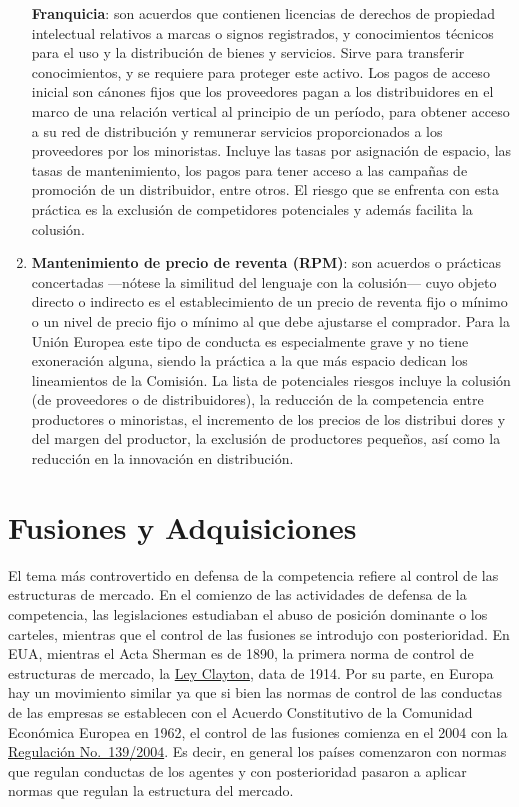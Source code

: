 \documentclass[
  12pt,
  spanish,
]{book}
\begin{document}
\begin{enumerate}
  \textbf{Franquicia}: son acuerdos que contienen licencias de derechos
  de propiedad intelectual relativos a marcas o signos registrados, y
  conocimientos técnicos para el uso y la distribución de bienes y
  servicios. Sirve para transferir conocimientos, y se requiere para
  proteger este activo. Los pagos de acceso inicial son cánones fijos
  que los proveedores pagan a los distribuidores en el marco de una
  relación vertical al principio de un período, para obtener acceso a su
  red de distribución y remunerar servicios proporcionados a los
  proveedores por los minoristas. Incluye las tasas por asignación de
  espacio, las tasas de mantenimiento, los pagos para tener acceso a las
  campañas de promoción de un distribuidor, entre otros. El riesgo que
  se enfrenta con esta práctica es la exclusión de competidores
  potenciales y además facilita la colusión.
\item
  \textbf{Mantenimiento de precio de reventa (RPM)}: son acuerdos o
  prácticas concertadas ---nótese la similitud del lenguaje con la
  colusión--- cuyo objeto directo o indirecto es el establecimiento de
  un precio de reventa fijo o mínimo o un nivel de precio fijo o mínimo
  al que debe ajustarse el comprador. Para la Unión Europea este tipo de
  conducta es especialmente grave y no tiene exoneración alguna, siendo
  la práctica a la que más espacio dedican los lineamientos de la
  Comisión. La lista de potenciales riesgos incluye la colusión (de
  proveedores o de distribuidores), la reducción de la competencia entre
  productores o minoristas, el incremento de los precios de los
  distribui dores y del margen del productor, la exclusión de
  productores pequeños, así como la reducción en la innovación en
  distribución.
\end{enumerate}

\hypertarget{fusiones-y-adquisiciones}{%
\section{Fusiones y Adquisiciones}\label{fusiones-y-adquisiciones}}

El tema más controvertido en defensa de la competencia refiere al
control de las estructuras de mercado. En el comienzo de las actividades
de defensa de la competencia, las legislaciones estudiaban el abuso de
posición dominante o los carteles, mientras que el control de las
fusiones se introdujo con posterioridad. En EUA, mientras el Acta
Sherman es de 1890, la primera norma de control de estructuras de
mercado, la
\href{https://wps.prenhall.com/wps/media/objects/751/769950/Documents_Library/clayton.htm}{Ley
Clayton}, data de 1914. Por su parte, en Europa hay un movimiento
similar ya que si bien las normas de control de las conductas de las
empresas se establecen con el Acuerdo Constitutivo de la Comunidad
Económica Europea en 1962, el control de las fusiones comienza en el
2004 con la
\href{https://eur-lex.europa.eu/legal-content/ES/TXT/PDF/?uri=CELEX:32004R0139\&from=ES}{Regulación
No.~139/2004}. Es decir, en general los países comenzaron con normas que
regulan conductas de los agentes y con posterioridad pasaron a aplicar
normas que regulan la estructura del mercado.
\end{document}

